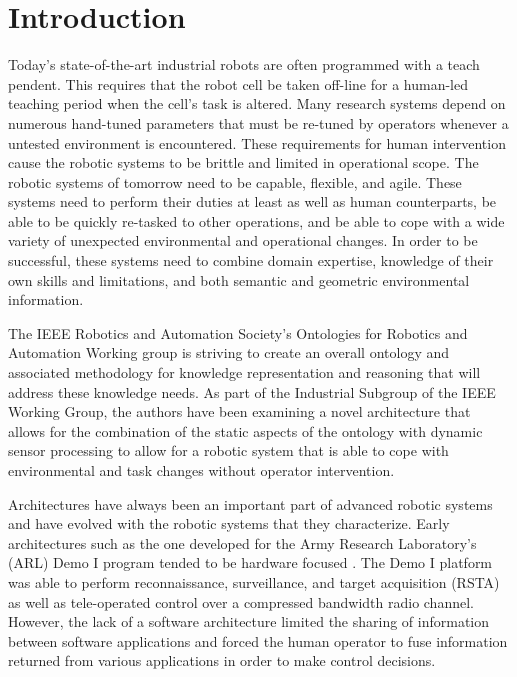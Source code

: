 \documentclass[preprint,12pt]{elsarticle}
\begin{document}

\section{Introduction}
\label{sect:introduction}
Today's state-of-the-art industrial robots are often programmed with a teach pendent. This requires that the robot cell be taken off-line for a
human-led teaching period when the cell\rq{}s
task is altered.  Many research systems depend on numerous hand-tuned parameters that must be re-tuned by operators whenever a untested
environment is encountered. These requirements for human intervention cause the robotic systems
to be brittle and limited in operational scope. The robotic systems of tomorrow
need to be capable, flexible, and agile.  These systems need to perform their duties at least as well as human counterparts, be able to be quickly re-tasked to other operations,
and be able to cope with a wide variety of unexpected environmental and operational changes. In order to be successful, these systems need to combine domain expertise,
knowledge of their own skills and limitations, and both semantic and geometric environmental information.

The IEEE Robotics and Automation Society\rq{}s Ontologies for Robotics and Automation Working group is striving to create an overall ontology and
associated methodology for knowledge representation and reasoning that will address these knowledge needs. As part of the
Industrial Subgroup of the IEEE Working Group, the authors have been examining a novel architecture that allows for the combination of the static
aspects of the ontology with dynamic sensor processing to allow for a robotic system that is able to cope with environmental and task changes
without operator intervention.

Architectures have always been an important part of advanced robotic systems and have evolved with the robotic systems that they characterize.
Early architectures such as the one developed for the Army Research Laboratory\rq{}s (ARL) Demo I program tended to be hardware focused
\cite{Balakirsky93}. The Demo I platform was able to perform reconnaissance, surveillance, and target acquisition (RSTA) as well as tele-operated
control over a compressed bandwidth
radio channel. However, the lack of a software architecture limited the sharing of information between software applications and forced the human
operator to fuse information returned from various applications in order to make control decisions.
\end{document}

